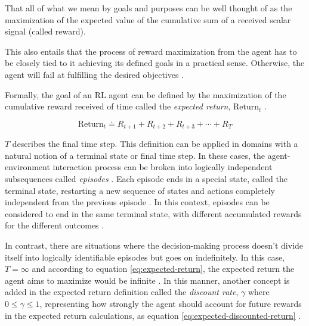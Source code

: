 \begin{displayquote}
	That all of what we mean by goals and purposes can be well thought of as the maximization of the expected value of the cumulative sum of a received scalar signal (called reward). \cite{suttonReinforcementLearningIntroduction2014}
\end{displayquote}
This also entails that the process of reward maximization from the agent has to be closely tied to it achieving its defined goals in a practical sense. Otherwise, the agent will fail at fulfilling the desired objectives \cite{suttonReinforcementLearningIntroduction2014}.

Formally, the goal of an \ac{RL} agent can be defined by the maximization of the cumulative reward received of time called the \textit{expected return}, $\text{Return}_t$ \cite{suttonReinforcementLearningIntroduction2014}.

\begin{equation} \label{eq:expected-return}
	\text{Return}_t \doteq R_{t+1} + R_{t+2} + R_{t+3} + \cdots + R_T
\end{equation}

$T$ describes the final time step. This definition can be applied in domains with a natural notion of a terminal state or final time step. In these cases, the agent-environment interaction process can be broken into logically independent subsequences called \textit{episodes} \cite{suttonReinforcementLearningIntroduction2014}. Each episode ends in a special state, called the terminal state, restarting a new sequence of states and actions completely independent from the previous episode \cite{suttonReinforcementLearningIntroduction2014}. In this context, episodes can be considered to end in the same terminal state, with different accumulated rewards for the different outcomes \cite{suttonReinforcementLearningIntroduction2014}.

In contrast, there are situations where the decision-making process doesn't divide itself into logically identifiable episodes but goes on indefinitely. In this case, $T = \infty$ and according to equation \ref{eq:expected-return}, the expected return the agent aims to maximize would be infinite \cite{suttonReinforcementLearningIntroduction2014}. In this manner, another concept is added in the expected return definition called the \textit{discount rate}, $\gamma$ where $0 \leq \gamma \leq 1$, representing how strongly the agent should account for future rewards in the expected return calculations, as equation \ref{eq:expected-discounted-return} \cite{suttonReinforcementLearningIntroduction2014}.

